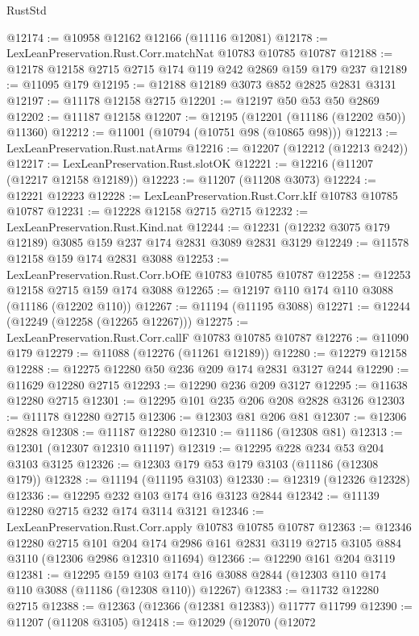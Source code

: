\begin{lexlean}{RustStd}
\begin{coremodule}
@12174 := @10958 @12162 @12166 (@11116 @12081)
@12178 := LexLeanPreservation.Rust.Corr.matchNat @10783 @10785 @10787
@12188 := @12178 @12158 @2715 @2715 @174 @119 @242 @2869 @159 @179 @237
@12189 := @11095 @179
@12195 := @12188 @12189 @3073 @852 @2825 @2831 @3131
@12197 := @11178 @12158 @2715
@12201 := @12197 @50 @53 @50 @2869
@12202 := @11187 @12158
@12207 := @12195 (@12201 (@11186 (@12202 @50)) @11360)
@12212 := @11001 (@10794 (@10751 @98 (@10865 @98)))
@12213 := LexLeanPreservation.Rust.natArms
@12216 := @12207 (@12212 (@12213 @242))
@12217 := LexLeanPreservation.Rust.slotOK
@12221 := @12216 (@11207 (@12217 @12158 @12189))
@12223 := @11207 (@11208 @3073)
@12224 := @12221 @12223
@12228 := LexLeanPreservation.Rust.Corr.kIf @10783 @10785 @10787
@12231 := @12228 @12158 @2715 @2715
@12232 := LexLeanPreservation.Rust.Kind.nat
@12244 := @12231 (@12232 @3075 @179 @12189) @3085 @159 @237 @174 @2831 @3089 @2831 @3129
@12249 := @11578 @12158 @159 @174 @2831 @3088
@12253 := LexLeanPreservation.Rust.Corr.bOfE @10783 @10785 @10787
@12258 := @12253 @12158 @2715 @159 @174 @3088
@12265 := @12197 @110 @174 @110 @3088 (@11186 (@12202 @110))
@12267 := @11194 (@11195 @3088)
@12271 := @12244 (@12249 (@12258 (@12265 @12267)))
@12275 := LexLeanPreservation.Rust.Corr.callF @10783 @10785 @10787
@12276 := @11090 @179
@12279 := @11088 (@12276 (@11261 @12189))
@12280 := @12279 @12158
@12288 := @12275 @12280 @50 @236 @209 @174 @2831 @3127 @244
@12290 := @11629 @12280 @2715
@12293 := @12290 @236 @209 @3127
@12295 := @11638 @12280 @2715
@12301 := @12295 @101 @235 @206 @208 @2828 @3126
@12303 := @11178 @12280 @2715
@12306 := @12303 @81 @206 @81
@12307 := @12306 @2828
@12308 := @11187 @12280
@12310 := @11186 (@12308 @81)
@12313 := @12301 (@12307 @12310 @11197)
@12319 := @12295 @228 @234 @53 @204 @3103 @3125
@12326 := @12303 @179 @53 @179 @3103 (@11186 (@12308 @179))
@12328 := @11194 (@11195 @3103)
@12330 := @12319 (@12326 @12328)
@12336 := @12295 @232 @103 @174 @16 @3123 @2844
@12342 := @11139 @12280 @2715 @232 @174 @3114 @3121
@12346 := LexLeanPreservation.Rust.Corr.apply @10783 @10785 @10787
@12363 := @12346
    @12280
    @2715
    @101
    @204
    @174
    @2986
    @161
    @2831
    @3119
    @2715
    @3105
    @884
    @3110
    (@12306 @2986 @12310 @11694)
@12366 := @12290 @161 @204 @3119
@12381 := @12295
    @159
    @103
    @174
    @16
    @3088
    @2844
    (@12303 @110 @174 @110 @3088 (@11186 (@12308 @110)) @12267)
@12383 := @11732 @12280 @2715
@12388 := @12363 (@12366 (@12381 @12383)) @11777 @11799
@12390 := @11207 (@11208 @3105)
@12418 := @12029
    (@12070
      (@12072

\end{coremodule}
\end{lexlean}
